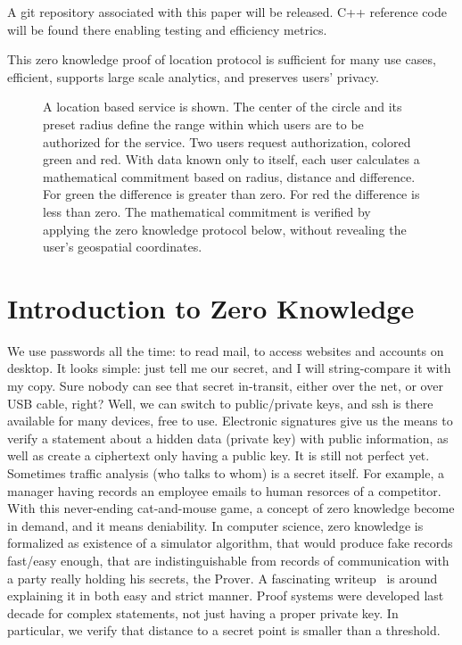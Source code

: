 \documentclass{article}
\begin{document}
A git repository associated with this paper will be released. C++ reference code will be found there enabling testing and efficiency metrics. 

This zero knowledge proof of location protocol is sufficient for many use cases, efficient, supports large scale analytics, and preserves users' privacy.

\begin{figure}
  \centering
  \def\svgwidth{\columnwidth}
  
\caption{A location based service is shown.
The center of the circle and its preset radius define the range within which users are to be authorized for the service.
Two users request authorization, colored green and red.
With data known only to itself, each user calculates a mathematical commitment based on radius, distance and difference.
For green the difference is greater than zero.
For red the difference is less than zero.
The mathematical commitment is verified by applying the zero knowledge protocol below, without revealing the user's geospatial coordinates.}
\label{fig-rangeproof}
\end{figure}

\section{Introduction to Zero Knowledge}

We use passwords all the time: to read mail, to access websites and accounts on desktop.
It looks simple: just tell me our secret, and I will string-compare it with my copy.
Sure nobody can see that secret in-transit, either over the net, or over USB cable, right?
Well, we can switch to public/private keys, and ssh is there available for many devices, free to use.
Electronic signatures give us the means to verify a statement about a hidden data (private key)
with public information, as well as create a ciphertext only having a public key.
It is still not perfect yet. Sometimes traffic analysis (who talks to whom) is a secret itself.
For example, a manager having records an employee emails to human resorces of a competitor.
With this never-ending cat-and-mouse game, a concept of zero knowledge become in demand,
and it means deniability.
In computer science, zero knowledge is formalized as existence of a simulator algorithm,
that would produce fake records fast/easy enough,
that are indistinguishable from records of communication with a party really holding his secrets, the Prover.
A fascinating writeup~\cite{Quisquater89} is around explaining it in both easy and strict manner.
Proof systems were developed last decade for complex statements, not just having a proper private key.
In particular, we verify that distance to a secret point is smaller than a threshold.
\end{document}
